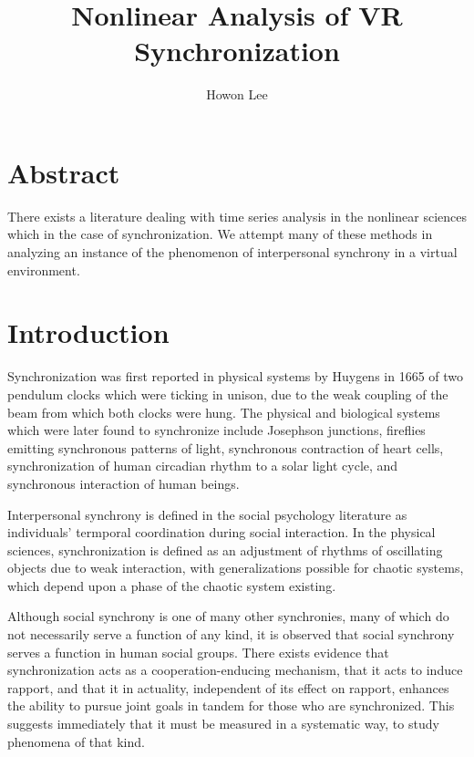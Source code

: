 \documentclass[12pt]{article}
\begin{document}
\title{Nonlinear Analysis of VR Synchronization}
\author{Howon Lee}
\maketitle

\section{Abstract}
There exists a literature dealing with time series analysis in the nonlinear sciences which in the case of synchronization. We attempt many of these methods in analyzing an instance of the phenomenon of interpersonal synchrony in a virtual environment.%


\section{Introduction}

Synchronization was first reported in physical systems by Huygens in 1665 of two pendulum clocks which were ticking in unison, due to the weak coupling of the beam from which both clocks were hung. The physical and biological systems which were later found to synchronize include Josephson junctions, fireflies emitting synchronous patterns of light, synchronous contraction of heart cells, synchronization of human circadian rhythm to a solar light cycle, and synchronous interaction of human beings. %

Interpersonal synchrony is defined in the social psychology literature as individuals' termporal coordination during social interaction. In the physical sciences, synchronization is defined as an adjustment of rhythms of oscillating objects due to weak interaction, with generalizations possible for chaotic systems, which depend upon a phase of the chaotic system existing. %

Although social synchrony is one of many other synchronies, many of which do not necessarily serve a function of any kind, it is observed that social synchrony serves a function in human social groups. There exists evidence that synchronization acts as a cooperation-enducing mechanism, that it acts to induce rapport, and that it in actuality, independent of its effect on rapport, enhances the ability to pursue joint goals in tandem for those who are synchronized. This suggests immediately that it must be measured in a systematic way, to study phenomena of that kind. %
\end{document}

